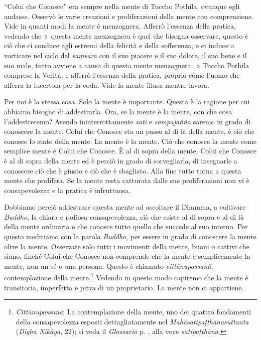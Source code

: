 ``Colui che Conosce'' era sempre nella mente di Tuccho Pothila, ovunque
egli andasse. Osservò le varie creazioni e proliferazioni della mente
con comprensione. Vide in quanti modi la mente è menzognera. Afferrò
l'essenza della pratica, vedendo che «~questa mente menzognera è quel
che bisogna osservare, questo è ciò che ci conduce agli estremi della
felicità e della sofferenza, e ci induce a vorticare nel ciclo del
\emph{saṃsāra} con il suo piacere e il suo dolore, il suo bene e il suo
male, tutto avviene a causa di questa mente menzognera.~» Tuccho Pothila
comprese la Verità, e afferrò l'essenza della pratica, proprio come
l'uomo che afferra la lucertola per la coda. Vide la mente illusa mentre
lavora.

Per noi è la stessa cosa. Solo la mente è importante. Questa è la
ragione per cui abbiamo bisogno di addestrarla. Ora, se la mente è la
mente, con che cosa l'addestreremo? Avendo ininterrottamente \emph{sati}
e \emph{sampajañña} saremo in grado di conoscere la mente. Colui che
Conosce sta un passo al di là della mente, è ciò che conosce lo stato
della mente. La mente è la mente. Ciò che conosce la mente come semplice
mente è Colui che Conosce. È al di sopra della mente. Colui che Conosce
è al di sopra della mente ed è perciò in grado di sorvegliarla, di
insegnarle a conoscere ciò che è giusto e ciò che è sbagliato. Alla fine
tutto torna a questa mente che prolifera. Se la mente resta catturata
dalle sue proliferazioni non vi è consapevolezza e la pratica è
infruttuosa.

Dobbiamo perciò addestrare questa mente ad ascoltare il Dhamma, a
coltivare \emph{Buddho}, la chiara e radiosa consapevolezza, ciò che
esiste al di sopra e al di là della mente ordinaria e che conosce tutto
quello che succede al suo interno. Per questo meditiamo con la parola
\emph{Buddho}, per essere in grado di conoscere la mente oltre la mente.
Osservate solo tutti i movimenti della mente, buoni o cattivi che siano,
finché Colui che Conosce non comprende che la mente è semplicemente la
mente, non un sé o una persona. Questo è chiamato \emph{cittānupassanā},
contemplazione della mente.\footnote{\emph{Cittānupassanā}: La
  contemplazione della mente, uno dei quattro fondamenti della
  consapevolezza esposti dettagliatamente nel
  \emph{Mahāsatipaṭṭhānasuttanta} (\emph{Dīgha Nikāya}, 22); si veda il
  \emph{Glossario} p. \pageref{glossary-satipatthana}, alla voce \emph{satipaṭṭhāna}.} Vedendo in questo
modo capiremo che la mente è transitoria, imperfetta e priva di un
proprietario. La mente non ci appartiene.

